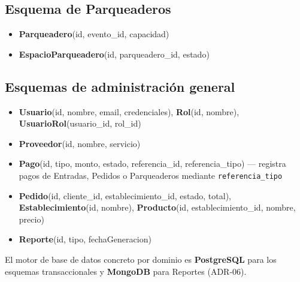 \subsection*{Esquema de Parqueaderos}
\begin{itemize}
\item \textbf{Parqueadero}(id, evento\_id, capacidad)
\item \textbf{EspacioParqueadero}(id, parqueadero\_id, estado)
\end{itemize}

\subsection*{Esquemas de administración general}
\begin{itemize}
\item \textbf{Usuario}(id, nombre, email, credenciales), \textbf{Rol}(id, nombre),
\textbf{UsuarioRol}(usuario\_id, rol\_id)
\item \textbf{Proveedor}(id, nombre, servicio)
\item \textbf{Pago}(id, tipo, monto, estado, referencia\_id, referencia\_tipo) — registra pagos de
Entradas, Pedidos o Parqueaderos mediante \texttt{referencia\_tipo}
\item \textbf{Pedido}(id, cliente\_id, establecimiento\_id, estado, total),
\textbf{Establecimiento}(id, nombre), \textbf{Producto}(id, establecimiento\_id, nombre, precio)
\item \textbf{Reporte}(id, tipo, fechaGeneracion)
\end{itemize}

El motor de base de datos concreto por dominio es \textbf{PostgreSQL} para los esquemas
transaccionales y \textbf{MongoDB} para Reportes (ADR-06).
